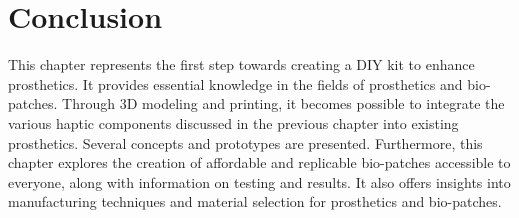 \section{Conclusion}
This chapter represents the first step towards creating a DIY kit to enhance prosthetics. It provides essential knowledge in the fields of prosthetics and bio-patches. Through 3D modeling and printing, it becomes possible to integrate the various haptic components discussed in the previous chapter into existing prosthetics. Several concepts and prototypes are presented. Furthermore, this chapter explores the creation of affordable and replicable bio-patches accessible to everyone, along with information on testing and results. It also offers insights into manufacturing techniques and material selection for prosthetics and bio-patches.